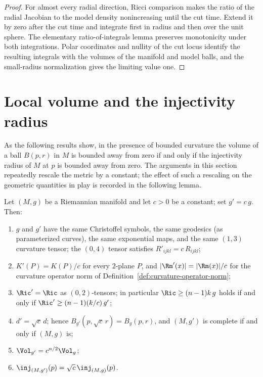 \begin{proof}
\sketch
{}
For almost every radial direction, Ricci comparison makes the ratio of the radial Jacobian to the model density nonincreasing until the cut time. Extend it by zero after the cut time and integrate first in radius and then over the unit sphere. The elementary ratio-of-integrals lemma preserves monotonicity under both integrations. Polar coordinates and nullity of the cut locus identify the resulting integrals with the volumes of the manifold and model balls, and the small-radius normalization gives the limiting value one.
\end{proof}

\section{Local volume and the injectivity radius}

As the following results show, in the presence of bounded curvature the volume
of a ball $B(p,r)$ in $M$ is bounded away from zero if and only if the
injectivity radius of $M$ at $p$ is bounded away from zero.
The arguments in this section repeatedly rescale the metric by a
constant; the effect of such a rescaling on the geometric
quantities in play is recorded in the following lemma.

\begin{lemma}
\label{lem:metric-rescaling}
\leanok
{}

Let $(M,g)$ be a Riemannian manifold and let $c>0$ be a constant;
set $g'=c\,g$. Then:
\begin{enumerate}
\item $g$ and $g'$ have the same Christoffel symbols, the same
geodesics (as parameterized curves), the same exponential maps, and
the same $(1,3)$ curvature tensor; the $(0,4)$ tensor satisfies
$R'_{ijkl}=c\,R_{ijkl}$;
\item $K'(P)=K(P)/c$ for every $2$-plane $P$, and
$|\Rm'(x)|=|\Rm(x)|/c$ for the curvature operator norm of
Definition~\ref{def:curvature-operator-norm};
\item $\Ric'=\Ric$ as $(0,2)$-tensors; in particular
$\Ric\ge(n-1)k\,g$ holds if and only if
$\Ric'\ge(n-1)(k/c)\,g'$;
\item $d'=\sqrt{c}\,d$; hence $B_{g'}(p,\sqrt{c}\,r)=B_g(p,r)$,
and $(M,g')$ is complete if and only if $(M,g)$ is;
\item $\Vol_{g'}=c^{n/2}\Vol_g$;
\item $\inj_{(M,g')}(p)=\sqrt{c}\,\inj_{(M,g)}(p)$.
\end{enumerate}
\end{lemma}

